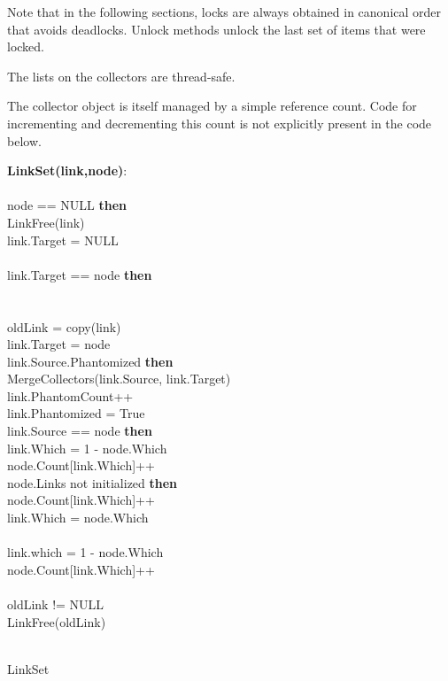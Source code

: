 Note that in the following sections, locks are always obtained in canonical order that avoids deadlocks. Unlock methods unlock the last set of items that were locked.

The lists on the collectors are thread-safe.

The collector object is itself managed by a simple reference count. Code for incrementing and decrementing this count is not explicitly present in the code below.


\begin{algorithm}[ht]
{\small
{}
{\bf LinkSet(link,node)}:\\
\\
 node == NULL {\bf then}\\
\quad \quad LinkFree(link)\\
\quad \quad link.Target = NULL\\
\\
 link.Target == node {\bf then}\\
\quad {}\\
\\
\quad oldLink = copy(link) \\
\quad link.Target = node\\
 link.Source.Phantomized {\bf then}\\
\quad \quad MergeCollectors(link.Source, link.Target)\\
\quad \quad link.PhantomCount++\\
\quad \quad link.Phantomized = True\\
 link.Source == node {\bf then}\\
\quad \quad link.Which = 1 - node.Which\\
\quad \quad node.Count[link.Which]++\\
 node.Links not initialized {\bf then}\\
\quad \quad node.Count[link.Which]++\\
\quad \quad link.Which = node.Which\\
\\
\quad \quad link.which = 1 - node.Which\\
\quad \quad node.Count[link.Which]++\\
\\
 oldLink != NULL\\
\quad \quad LinkFree(oldLink)\\
\\
}
\caption{LinkSet}
\label{single:algorithm:linkset}
\end{algorithm}
